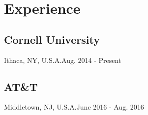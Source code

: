 \documentclass{article}
\begin{document}
\section{Experience}
\subsection{Cornell University}{Ithaca, NY, U.S.A.}{Aug. 2014  - Present}
\\
\subsection{AT\&T}{Middletown, NJ, U.S.A.}{June 2016  - Aug. 2016}

\iffalse
\subsection{Army, Republic of China Armed Forces}{Taipei, Taiwan}{Aug. 2012  - July 2013}
\content{
\position{Chief Counselor, Second Lieutenant}
\bulletitem{Chief political warfare manager of a company.}
}\vspace*{0.1cm}
\fi

\iffalse
\section{Leadership and Activities}
\subsection{Cornell Taiwanese Student Association (CTSA)}{Webmaster}{May 2014 - Present}
\subsection{National Experimental High School at Hsinchu Science Park (NEHS) Alumni Association}{Founding Member and Director of Information Division}{Oct. 2010 - July 2012}
\subsection{NTU Electrical Engineering Summer Camp}{Instructor of Programming Languages and Director of Education}{2009, 2010, 2011}
\fi
\end{document}
